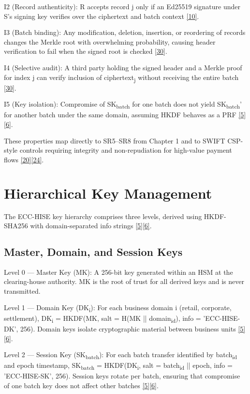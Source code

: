 \indent I2 (Record authenticity): R accepts record j only if an Ed25519 signature under S's signing key verifies over the ciphertext and batch context \hyperref[ref:10]{[10]}.

\indent I3 (Batch binding): Any modification, deletion, insertion, or reordering of records changes the Merkle root with overwhelming probability, causing header verification to fail when the signed root is checked \hyperref[ref:30]{[30]}.

\indent I4 (Selective audit): A third party holding the signed header and a Merkle proof for index j can verify inclusion of ciphertext\textsubscript{j} without receiving the entire batch \hyperref[ref:30]{[30]}.

\indent I5 (Key isolation): Compromise of SK\textsubscript{batch} for one batch does not yield SK\textsubscript{batch}' for another batch under the same domain, assuming HKDF behaves as a PRF \hyperref[ref:5]{[5]}\hyperref[ref:6]{[6]}.

\indent These properties map directly to SR5--SR8 from Chapter 1 and to SWIFT CSP-style controls requiring integrity and non-repudiation for high-value payment flows \hyperref[ref:20]{[20]}\hyperref[ref:24]{[24]}.

\section{Hierarchical Key Management}

\indent The ECC-HISE key hierarchy comprises three levels, derived using HKDF-SHA256 with domain-separated info strings \hyperref[ref:5]{[5]}\hyperref[ref:6]{[6]}.

\subsection{Master, Domain, and Session Keys}

\indent Level 0 --- Master Key (MK): A 256-bit key generated within an HSM at the clearing-house authority. MK is the root of trust for all derived keys and is never transmitted.

\indent Level 1 --- Domain Key (DK\textsubscript{i}): For each business domain i (retail, corporate, settlement), DK\textsubscript{i} = HKDF(MK, salt = H(MK || domain\textsubscript{id}), info = 'ECC-HISE-DK', 256). Domain keys isolate cryptographic material between business units \hyperref[ref:5]{[5]}\hyperref[ref:6]{[6]}.

\indent Level 2 --- Session Key (SK\textsubscript{batch}): For each batch transfer identified by batch\textsubscript{id} and epoch timestamp, SK\textsubscript{batch} = HKDF(DK\textsubscript{i}, salt = batch\textsubscript{id} || epoch, info = 'ECC-HISE-SK', 256). Session keys rotate per batch, ensuring that compromise of one batch key does not affect other batches \hyperref[ref:5]{[5]}\hyperref[ref:6]{[6]}.

